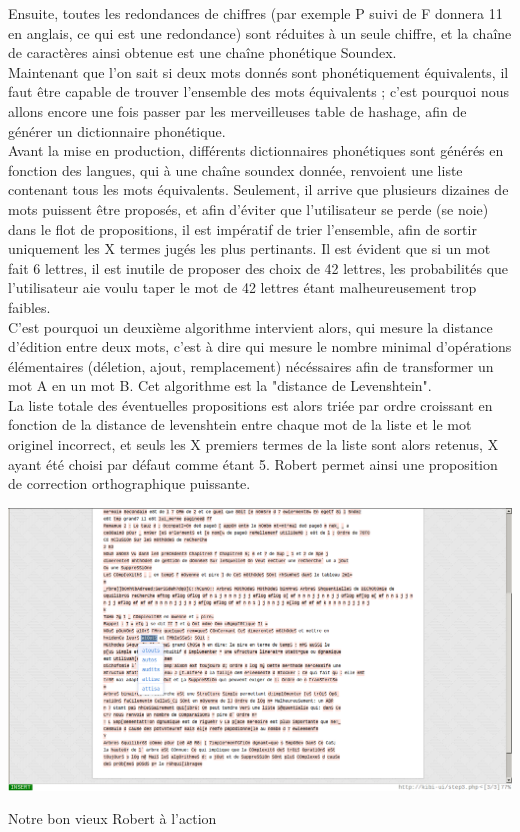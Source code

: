 Ensuite, toutes les redondances de chiffres (par exemple P suivi de F donnera 11 en anglais, ce qui est une redondance) sont réduites à un seule chiffre,
et la chaîne de caractères ainsi obtenue est une chaîne phonétique Soundex.\\
Maintenant que l'on sait si deux mots donnés sont phonétiquement équivalents, il faut être capable de trouver l'ensemble des mots équivalents ; c'est 
pourquoi nous allons encore une fois passer par les merveilleuses table de hashage, afin de générer un dictionnaire phonétique.\\
Avant la mise en production, différents dictionnaires phonétiques sont générés en fonction des langues, qui à une chaîne soundex donnée, renvoient
 une liste contenant tous les mots équivalents. 
Seulement, il arrive que plusieurs dizaines de mots puissent être proposés, et afin d'éviter que l'utilisateur se perde (se noie) dans le flot de propositions,
il est impératif de trier l'ensemble, afin de sortir uniquement les X termes jugés les plus pertinants. Il est évident que si un mot fait 6 lettres, il est inutile
de proposer des choix de 42 lettres, les probabilités que l'utilisateur aie voulu taper le mot de 42 lettres étant malheureusement trop faibles.\\
C'est pourquoi un deuxième algorithme intervient alors, qui mesure la distance d'édition entre deux mots, c'est à dire qui mesure le nombre minimal d'opérations élémentaires
(déletion, ajout, remplacement) nécéssaires afin de transformer un mot A en un mot B. Cet algorithme est la "distance de Levenshtein".\\
La liste totale des éventuelles propositions est alors triée par ordre croissant en fonction de la distance de levenshtein entre chaque mot de la liste et le mot originel incorrect,
et seuls les X premiers termes de la liste sont alors retenus, X ayant été choisi par défaut comme étant 5.
Robert permet ainsi une proposition de correction orthographique puissante.
\begin{center}
	\includegraphics[scale=1]{Pictures/robert.png}
	\caption{Notre bon vieux Robert à l'action}
\end{center}
